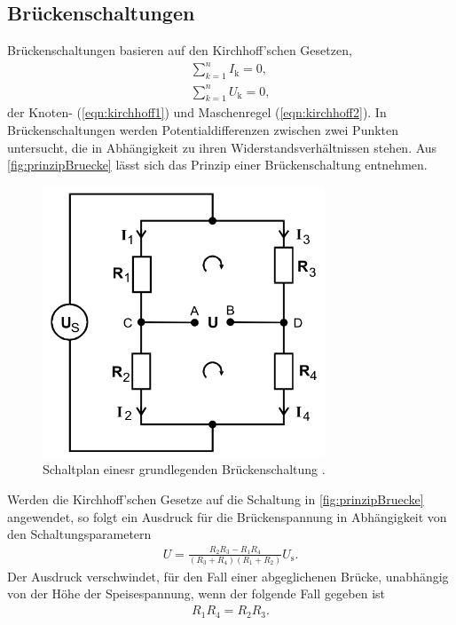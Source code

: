 \subsection{Brückenschaltungen}
Brückenschaltungen basieren auf den Kirchhoff'schen Gesetzen, 
\begin{align}
    \label{eqn:kirchhoff1}
    \sum_{k=1}^n I_{\text{k}} = 0, \\
    \label{eqn:kirchhoff2}
    \sum_{k=1}^n U_{\text{k}} = 0,
\end{align}
der Knoten- (\ref{eqn:kirchhoff1}) und Maschenregel (\ref{eqn:kirchhoff2}).
In Brückenschaltungen werden Potentialdifferenzen zwischen zwei Punkten untersucht, die in Abhängigkeit zu ihren Widerstandsverhältnissen
stehen. Aus \autoref{fig:prinzipBruecke} lässt sich das Prinzip einer Brückenschaltung entnehmen.
\begin{figure}[H]
    \centering
    \includegraphics[width=0.75\textwidth]{dateien/PrinzipBrueckenschaltung.png}
    \caption{Schaltplan einesr grundlegenden Brückenschaltung \cite{anleitung}.}
    \label{fig:prinzipBruecke}
\end{figure}
Werden die Kirchhoff'schen Gesetze auf die Schaltung in \autoref{fig:prinzipBruecke} angewendet, so folgt ein Ausdruck
für die Brückenspannung in Abhängigkeit von den Schaltungsparametern
\begin{align*}
    U = \frac{R_2R_3 - R_1R_4}{(R_3+R_4)(R_1+R_2)} U_{\text{s}}  .
\end{align*}
Der Ausdruck verschwindet, für den Fall einer abgeglichenen Brücke, unabhängig von der Höhe der Speisespannung, 
wenn der folgende Fall gegeben ist
\begin{align}
    \label{eqn:abgBr}
    R_1R_4=R_2R_3.
\end{align}



